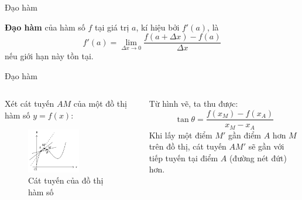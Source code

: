 \begin{frame}{Đạo hàm}
    \begin{tcolorbox}[colback=blue!10, colframe=blue!50!black, title=Định nghĩa]
    \textbf{Đạo hàm} của hàm số $f$ tại giá trị $a$, kí hiệu bởi $f'(a)$, là
    \begin{equation}
        f'(a)=\lim_{\Delta x\rightarrow 0}\dfrac{f(a+\Delta x)-f(a)}{\Delta x}
    \end{equation}
    nếu giới hạn này tồn tại.
    \end{tcolorbox}
\end{frame}
\begin{frame}{Đạo hàm}
    \begin{columns}
        \begin{column}{0.5\textwidth}
    Xét cát tuyến \(AM\) của một đồ thị hàm số \(y=f(x)\):
    \begin{figure}
        \centering
        \includegraphics[width=0.6\textwidth]{Slides/figure/cattuyen.png}
        \caption{Cát tuyến của đồ thị hàm số}
    \end{figure}
    \end{column}
        \begin{column}{0.5\textwidth}
    Từ hình vẽ, ta thu được:
    \begin{equation}
    \tan\theta=\dfrac{f(x_M)-f(x_A)}{x_M-x_A}
    \end{equation}
    Khi lấy một điểm \(M'\) gần điểm \(A\) hơn \(M\) trên đồ thị, cát tuyến \(AM'\) sẽ gần với tiếp tuyến tại điểm \(A\) (đường nét đứt) hơn.
    \end{column}
    \end{columns}
\end{frame}

